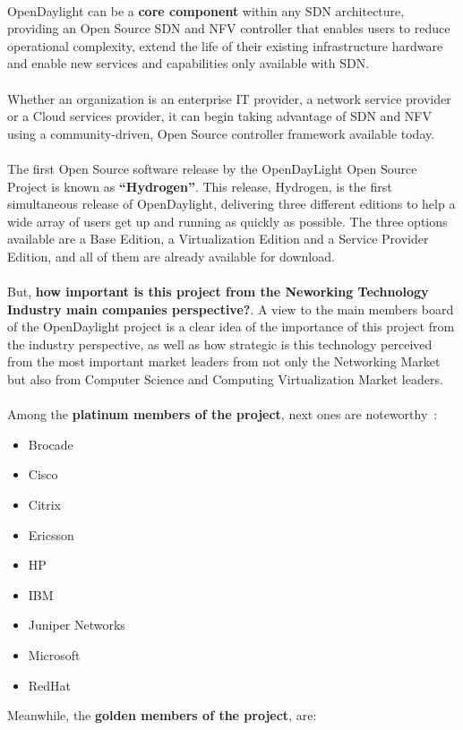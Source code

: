 \documentclass[a4paper, 12pt]{book}
\begin{document}
\\
OpenDaylight can be a \textbf{core component} within any SDN architecture, providing an Open Source SDN and NFV controller that enables users to reduce operational complexity, extend the life of their existing infrastructure hardware and enable new services and capabilities only available with SDN.\\
\\
Whether an organization is an enterprise IT provider, a network service provider or a Cloud services provider, it can begin taking advantage of SDN and NFV using a community-driven, Open Source controller framework available today.\\
\\
The first Open Source software release by the OpenDayLight Open Source Project is known as \textbf{``Hydrogen''}. This release, Hydrogen, is the first simultaneous release of OpenDaylight, delivering three different editions to help a wide array of users get up and running as quickly as possible. The three options available are a Base Edition, a Virtualization Edition and a Service Provider Edition, and all of them are already available for download.\\
\\
But, \textbf{how important is this project from the Neworking Technology Industry main companies perspective?}. A view to the main members board of the OpenDaylight project is a clear idea of the importance of this project from the industry perspective, as well as how strategic is this technology perceived from the most important market leaders from not only the Networking Market but also from Computer Science and Computing Virtualization Market leaders.\\
\\
Among the \textbf{platinum members of the project}, next ones are noteworthy~\cite{OpenDaylightMembers}:
 \begin{itemize}\itemsep0pt
  \item Brocade
  \item Cisco
  \item Citrix
  \item Ericsson
  \item HP
  \item IBM
  \item Juniper Networks
  \item Microsoft
  \item RedHat
 \end{itemize}
Meanwhile, the \textbf{golden members of the project}, are:
\end{document}
